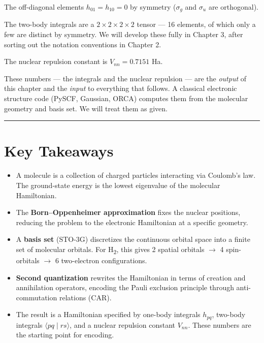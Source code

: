 \documentclass[
  11pt,
  oneside]{book}
\providecommand{\tightlist}{%
  \setlength{\itemsep}{0pt}\setlength{\parskip}{0pt}}
\begin{document}
The off-diagonal elements \(h_{01} = h_{10} = 0\) by symmetry
(\(\sigma_g\) and \(\sigma_u\) are orthogonal).

The two-body integrals are a \(2 \times 2 \times 2 \times 2\) tensor ---
16 elements, of which only a few are distinct by symmetry. We will
develop these fully in Chapter 3, after sorting out the notation
conventions in Chapter 2.

The nuclear repulsion constant is \(V_{nn} = 0.7151\) Ha.

These numbers --- the integrals and the nuclear repulsion --- are the
\emph{output} of this chapter and the \emph{input} to everything that
follows. A classical electronic structure code (PySCF, Gaussian, ORCA)
computes them from the molecular geometry and basis set. We will treat
them as given.

\begin{center}\rule{0.5\linewidth}{0.5pt}\end{center}

\section{Key Takeaways}\label{key-takeaways}

\begin{itemize}
\tightlist
\item
  A molecule is a collection of charged particles interacting via
  Coulomb's law. The ground-state energy is the lowest eigenvalue of the
  molecular Hamiltonian.
\item
  The \textbf{Born--Oppenheimer approximation} fixes the nuclear
  positions, reducing the problem to the electronic Hamiltonian at a
  specific geometry.
\item
  A \textbf{basis set} (STO-3G) discretizes the continuous orbital space
  into a finite set of molecular orbitals. For H\textsubscript{2}, this gives 2 spatial
  orbitals $\rightarrow$ 4 spin-orbitals $\rightarrow$ 6 two-electron configurations.
\item
  \textbf{Second quantization} rewrites the Hamiltonian in terms of
  creation and annihilation operators, encoding the Pauli exclusion
  principle through anti-commutation relations (CAR).
\item
  The result is a Hamiltonian specified by one-body integrals
  \(h_{pq}\), two-body integrals \(\langle pq \mid rs\rangle\), and a
  nuclear repulsion constant \(V_{nn}\). These numbers are the starting
  point for encoding.
\end{itemize}
\end{document}
